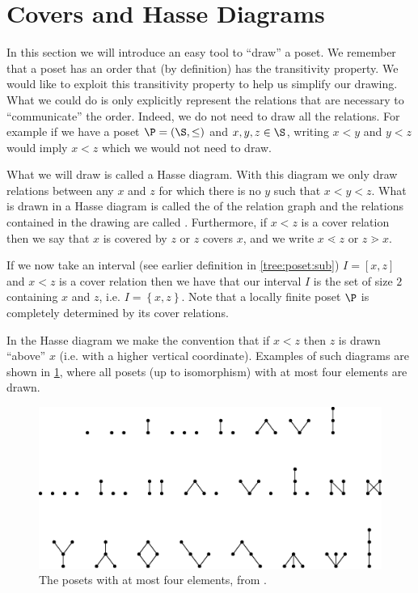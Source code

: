 \section{Covers and Hasse Diagrams}
\label{tree:poset:hasse}


In this section we will introduce an easy tool to ``draw'' a poset. We remember
that a poset has an order that (by definition) has the transitivity property.
We would like to exploit this transitivity property to help us simplify our
drawing. What we could do is only explicitly represent the relations that are
necessary to ``communicate'' the order. Indeed, we do not need to draw
all the relations. For example if we have a poset $\P = (\S, \le)$ and $x, y, z
\in \S$, writing $x < y$ and $y < z$ would imply $x < z$ which we would not need
to draw.


What we will draw is called a Hasse diagram. With this diagram we only draw
relations between any $x$ and $z$ for which there is no $y$ such that $x < y <
z$.
What is drawn in a Hasse diagram is called the 
of the relation graph and the relations contained in the drawing are called
. Furthermore, if $x < z$ is a cover relation then we
say that $x$ is covered by $z$ or $z$ covers $x$, and we write $x \lessdot z$
or $z \gtrdot x$.


If we now take an interval (see earlier definition in \ref{tree:poset:sub}) $I
= [x, z]$ and $x < z$ is a cover relation then we have that our interval $I$ is
the set of size $2$ containing $x$ and $z$, i.e. $I = \left\{{x, z}\right\}$.
Note that a locally finite poset $\P$ is completely determined by its cover
relations.

In the Hasse diagram we make the convention that if $x < z$ then $z$ is drawn
``above'' $x$ (i.e. with a higher vertical coordinate). Examples of such
diagrams are shown in \ref{fig:stanley:3-1}, where all posets (up to
isomorphism) with at most four elements are drawn.


\begin{figure}
	\centering
	\includegraphics[width=\textwidth]{fig/stanley/3-1}
	\caption{\label{fig:stanley:3-1} The posets with at most four elements,
from \citet*{Stanley:2011:ECV:2124415}.}
\end{figure}



